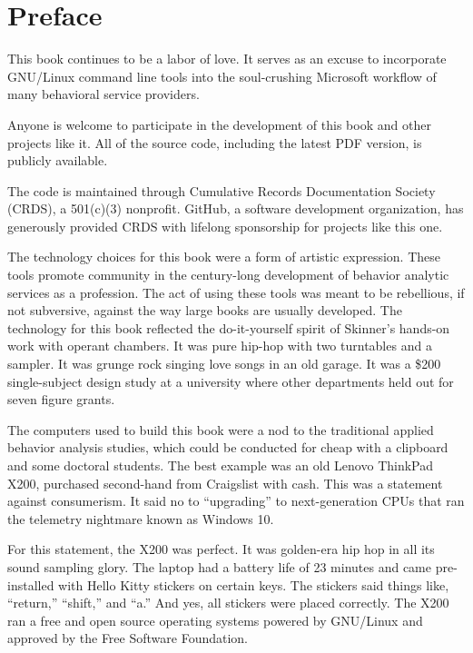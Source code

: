 \chapter{Preface}
This book continues to be a labor of love. It serves as an excuse to incorporate GNU/Linux command line tools into the soul-crushing Microsoft\textregistered{} workflow of many behavioral service providers. 

Anyone is welcome to participate in the development of this book and other projects like it. All of the source code, including the latest PDF version, is publicly available. 

The code is maintained through Cumulative Records Documentation Society (CRDS), a 501(c)(3) nonprofit. GitHub, a software development organization, has generously provided CRDS with lifelong sponsorship for projects like this one.

The technology choices for this book were a form of artistic expression. These tools promote community in the century-long development of behavior analytic services as a profession. The act of using these tools was meant to be rebellious, if not subversive, against the way large books are usually developed. The technology  for this book reflected the do-it-yourself spirit of Skinner's hands-on work with operant chambers. It was pure hip-hop with two turntables and a sampler. It was grunge rock singing love songs in an old garage. It was a \$200 single-subject design study at a university where other departments held out for seven figure grants.

The computers used to build this book were a nod to the traditional applied behavior analysis studies, which could be conducted for cheap with a clipboard and some doctoral students. The best example was an old Lenovo ThinkPad X200, purchased second-hand from Craigslist with cash. This was a statement against consumerism. It said no to ``upgrading'' to next-generation CPUs that ran the telemetry nightmare known as Windows 10.

For this statement, the X200 was perfect. It was golden-era hip hop in all its sound sampling glory. The laptop had a battery life of 23 minutes and came pre-installed with Hello Kitty stickers on certain keys. The stickers said things like, ``return,'' ``shift,'' and ``a.'' And yes, all stickers were placed correctly. The X200 ran a free and open source operating systems powered by GNU/Linux and approved by the Free Software Foundation.

